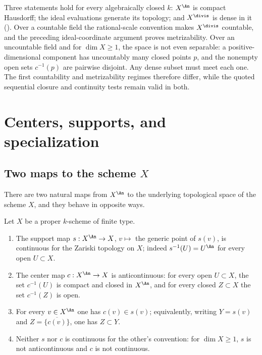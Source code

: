\begin{remark}
\label{rem:ch32-countability-summary}
Three statements hold for every algebraically closed $k$:
$X^{\An}$ is compact Hausdorff; the ideal evaluations generate its
topology; and $X^{\divis}$ is dense in it
().  Over a countable field the rational-scale convention makes
$X^{\divis}$ countable, and the preceding ideal-coordinate argument proves
metrizability.  Over an uncountable field and for $\dim X\geq1$, the space
is not even separable: a positive-dimensional component has uncountably
many closed points $p$, and the nonempty open sets $c^{-1}(p)$ are
pairwise disjoint.  Any dense subset must meet each one.  The first
countability and metrizability regimes therefore differ, while the quoted
sequential closure and continuity tests remain valid in both.
\end{remark}

\section{Centers, supports, and specialization}
\label{sec:ch32-centers}

\subsection{Two maps to the scheme \texorpdfstring{$X$}{X}}
\label{sec:ch32-two-maps}

There are two natural maps from $X^{\An}$ to the underlying topological
space of the scheme $X$, and they behave in opposite ways.

\begin{theorem}
\label{thm:ch32-support-center-maps}
Let $X$ be a proper $k$-scheme of finite type.
\begin{enumerate}
\item\label{itm:ch32-scm:s}
The support map $s:X^{\An}\to X$, $v\mapsto$ the generic point of
$s(v)$, is continuous for the Zariski topology on $X$; indeed
$s^{-1}(U)=U^{\An}$ for every open $U\subset X$.
\item\label{itm:ch32-scm:c}
The center map $c:X^{\An}\to X$ is anticontinuous: for every open
$U\subset X$, the set $c^{-1}(U)$ is compact and closed in
$X^{\An}$, and for every closed $Z\subset X$ the set $c^{-1}(Z)$ is
open.
\item\label{itm:ch32-scm:order}
For every $v\in X^{\An}$ one has $c(v)\in s(v)$; equivalently, writing
$Y=s(v)$ and $Z=\overline{\{c(v)\}}$, one has $Z\subset Y$.
\item\label{itm:ch32-scm:neither}
Neither $s$ nor $c$ is continuous for the other's convention: for
$\dim X\geq1$, $s$ is not anticontinuous and $c$ is not continuous.
\end{enumerate}
\end{theorem}

